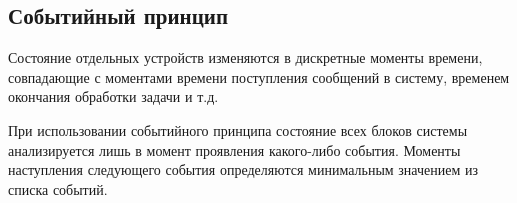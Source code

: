 \subsection{Событийный принцип}
Состояние отдельных устройств изменяются в дискретные моменты времени, совпадающие с моментами времени поступления сообщений в систему, временем окончания обработки задачи и т.д.

При использовании событийного принципа состояние всех блоков системы анализируется лишь в момент проявления какого-либо события. Моменты наступления следующего события определяются минимальным значением из списка событий.

